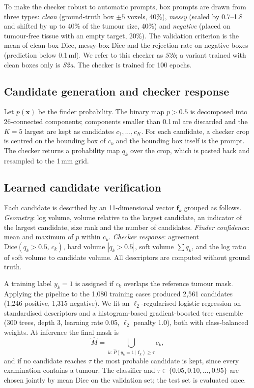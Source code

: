 \documentclass[journal]{IEEEtran}
\begin{document}
To make the checker robust to automatic prompts, box prompts are drawn from three types: \emph{clean} (ground-truth box $\pm5$ voxels, 40\%), \emph{messy} (scaled by 0.7--1.8 and shifted by up to 40\% of the tumour size, 40\%) and \emph{negative} (placed on tumour-free tissue with an empty target, 20\%). The validation criterion is the mean of clean-box Dice, messy-box Dice and the rejection rate on negative boxes (prediction below 0.1\,ml). We refer to this checker as \emph{S2b}; a variant trained with clean boxes only is \emph{S2a}. The checker is trained for 100 epochs.

\subsection{Candidate generation and checker response}
Let $p(\mathbf{x})$ be the finder probability. The binary map $p>0.5$ is decomposed into 26-connected components; components smaller than 0.1\,ml are discarded and the $K=5$ largest are kept as candidates $c_1,\dots,c_K$. For each candidate, a checker crop is centred on the bounding box of $c_k$ and the bounding box itself is the prompt. The checker returns a probability map $q_k$ over the crop, which is pasted back and resampled to the 1\,mm grid.

\subsection{Learned candidate verification}
Each candidate is described by an 11-dimensional vector $\mathbf{f}_k$ grouped as follows.
\emph{Geometry}: log volume, volume relative to the largest candidate, an indicator of the largest candidate, size rank and the number of candidates.
\emph{Finder confidence}: mean and maximum of $p$ within $c_k$.
\emph{Checker response}: agreement $\mathrm{Dice}(q_k>0.5,\,c_k)$, hard volume $|q_k>0.5|$, soft volume $\sum q_k$, and the log ratio of soft volume to candidate volume.
All descriptors are computed without ground truth.

A training label $y_k=1$ is assigned if $c_k$ overlaps the reference tumour mask. Applying the pipeline to the 1,080 training cases produced 2,561 candidates (1,246 positive, 1,315 negative). We fit an $\ell_2$-regularised logistic regression on standardised descriptors and a histogram-based gradient-boosted tree ensemble~\cite{friedman2001gbm,pedregosa2011sklearn} (300 trees, depth 3, learning rate 0.05, $\ell_2$ penalty 1.0), both with class-balanced weights. At inference the final mask is
\begin{equation}
\hat{M}=\bigcup_{k:\,\hat{P}(y_k=1\mid\mathbf{f}_k)\ge\tau} c_k ,
\end{equation}
and if no candidate reaches $\tau$ the most probable candidate is kept, since every examination contains a tumour. The classifier and $\tau\in\{0.05,0.10,\dots,0.95\}$ are chosen jointly by mean Dice on the validation set; the test set is evaluated once.
\end{document}
